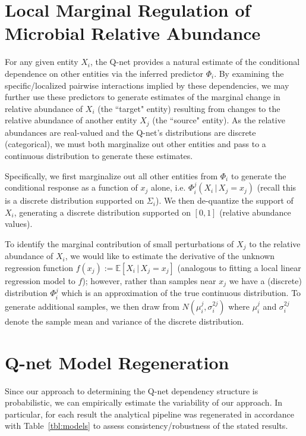 \documentclass[onecolumn,10pt]{IEEEtran}
\def\qnet{Q-net\xspace}
\def\SPREFIX{S-}
\def\SPREFIX{}
\begin{document}
\section{Local Marginal Regulation of Microbial Relative Abundance}
\label{sec:lomar}
For any given entity $X_i$, the \qnet provides a natural estimate of the conditional dependence on other entities via the inferred predictor $\Phi_i$.  By examining the specific/localized pairwise interactions implied by these dependencies, we may further use these predictors to generate estimates of the marginal change in relative abundance of $X_i$ (the ``target" entity) resulting from changes to the relative abundance of another entity $X_j$ (the ``source" entity). As the relative abundances are real-valued and the \qnet's distributions are discrete (categorical), we must both marginalize out other entities and pass to a continuous distribution to generate these estimates.

Specifically, we first marginalize out all other entities from $\Phi_i$ to generate the conditional response as a function of $x_j$ alone, i.e. $\Phi_i^j(X_i\,|\,X_j=x_j)$ (recall this is a discrete distribution supported on $\Sigma_i$).  We then de-quantize the support of $X_i$, generating a discrete distribution supported on $[0,1]$ (relative abundance values).  

To identify the marginal contribution of small perturbations of $X_j$ to the relative abundance of $X_i$, we would like to estimate the derivative of the unknown regression function $f(x_j) := \mathbb{E}[X_i\,|\,X_j=x_j]$ (analogous to fitting a local linear regression model to $f$); however, rather than samples near $x_j$ we have a (discrete) distribution $\Phi_i^j$ which is an approximation of the true continuous distribution.  To generate additional samples, we then draw from $N(\mu_i^j, \sigma^{2j}_i)$ where $\mu_i^j$ and $\sigma^{2j}_i$ denote the sample mean and variance of the discrete distribution.

\section{\qnet Model Regeneration}
\label{sec:regen}

Since our approach to determining the \qnet dependency structure is probabilistic, we can empirically estimate the variability of our approach.  In particular, for each result the analytical pipeline was regenerated in accordance with Table\SPREFIX~\ref{tbl:models} to assess consistency/robustness of the stated results.
\end{document}
